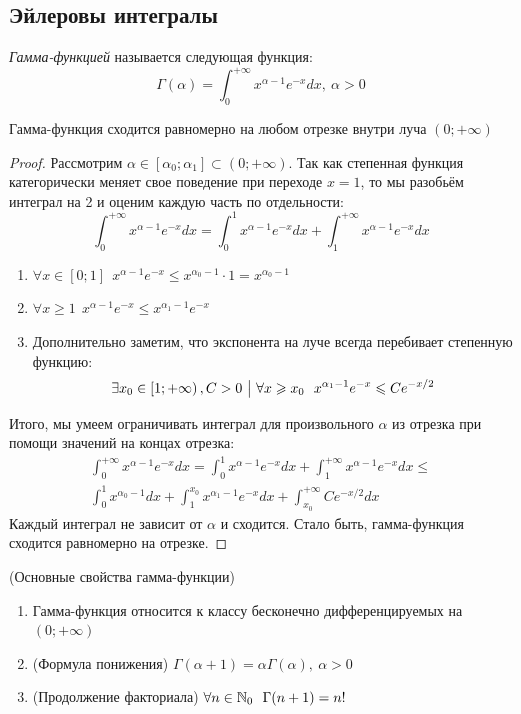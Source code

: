 \subsection{Эйлеровы интегралы}

\begin{definition}
	\textit{Гамма-функцией} называется следующая функция:
	\[
		\Gamma(\alpha) = \int_0^{+\infty} x^{\alpha - 1}e^{-x}dx,\ \alpha > 0
	\]
\end{definition}

\begin{proposition}
	Гамма-функция сходится равномерно на любом отрезке внутри луча $(0; +\infty)$
\end{proposition}

\begin{proof}
	Рассмотрим $\alpha \in [\alpha_0; \alpha_1] \subset (0; +\infty)$. Так как степенная функция категорически меняет свое поведение при переходе $x = 1$, то мы разобьём интеграл на 2 и оценим каждую часть по отдельности:
	\[
		\int_0^{+\infty} x^{\alpha - 1}e^{-x}dx = \int_0^1 x^{\alpha - 1}e^{-x}dx + \int_1^{+\infty} x^{\alpha - 1}e^{-x}dx
	\]
	\begin{enumerate}
		\item \(\forall x \in [0; 1]\ \ x^{\alpha - 1}e^{-x} \le x^{\alpha_0 - 1} \cdot 1 = x^{\alpha_0 - 1}\)
		
		\item \(\forall x \ge 1\ \ x^{\alpha - 1}e^{-x} \le x^{\alpha_1 - 1}e^{-x}\)
		
		\item Дополнительно заметим, что экспонента на луче всегда перебивает степенную функцию:
		\[
			\exists x_0 \in \left[1; +\infty\right), C > 0 \ \big|\  \forall x \geqslant x_0\ \ x^{\alpha_1 - 1}e^{-x} \leqslant Ce^{-x / 2}
		\]
	\end{enumerate}
	Итого, мы умеем ограничивать интеграл для произвольного $\alpha$ из отрезка при помощи значений на концах отрезка:
	\begin{multline*}
		\int_0^{+\infty} x^{\alpha - 1}e^{-x}dx = \int_0^1 x^{\alpha - 1}e^{-x}dx + \int_1^{+\infty}x^{\alpha - 1}e^{-x}dx \le
		\\
		\int_0^1 x^{\alpha_0 - 1}dx + \int_1^{x_0} x^{\alpha_1 - 1}e^{-x}dx + \int_{x_0}^{+\infty} Ce^{-x / 2}dx
	\end{multline*}
	Каждый интеграл не зависит от $\alpha$ и сходится. Стало быть, гамма-функция сходится равномерно на отрезке.
\end{proof}

\begin{theorem} (Основные свойства гамма-функции)
	\begin{enumerate}
		\item Гамма-функция относится к классу бесконечно дифференцируемых на $(0; +\infty)$
		
		\item (Формула понижения) $\Gamma(\alpha + 1) = \alpha\Gamma(\alpha),\ \alpha > 0$
		
		\item (Продолжение факториала) $\forall n \in \mathbb{N}_0\ \ \Gamma(n + 1) = n!$
	\end{enumerate}
\end{theorem}

